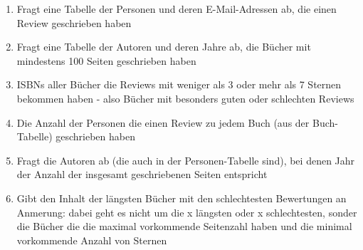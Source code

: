 \documentclass{article}
\begin{document}
\begin{mybox}

\begin{enumerate}
    \item Fragt eine Tabelle der Personen und deren E-Mail-Adressen ab, die einen Review geschrieben haben
    \item Fragt eine Tabelle der Autoren und deren Jahre ab, die Bücher mit mindestens 100 Seiten geschrieben haben 
    \item ISBNs aller Bücher die Reviews mit weniger als 3 oder mehr als 7 Sternen bekommen haben - also Bücher mit besonders guten oder schlechten Reviews
    \item  Die Anzahl der Personen die einen Review zu jedem Buch (aus der Buch-Tabelle) geschrieben haben 
    \item Fragt die Autoren ab (die auch in der Personen-Tabelle sind), bei denen Jahr der Anzahl der insgesamt geschriebenen Seiten entspricht
    \item Gibt den Inhalt der längsten Bücher mit den schlechtesten Bewertungen an  \\
    Anmerung: dabei geht es nicht um die x längsten oder x schlechtesten, sonder die Bücher die die maximal vorkommende Seitenzahl haben und die minimal vorkommende Anzahl von Sternen
\end{enumerate}
\end{mybox}
\end{document}
